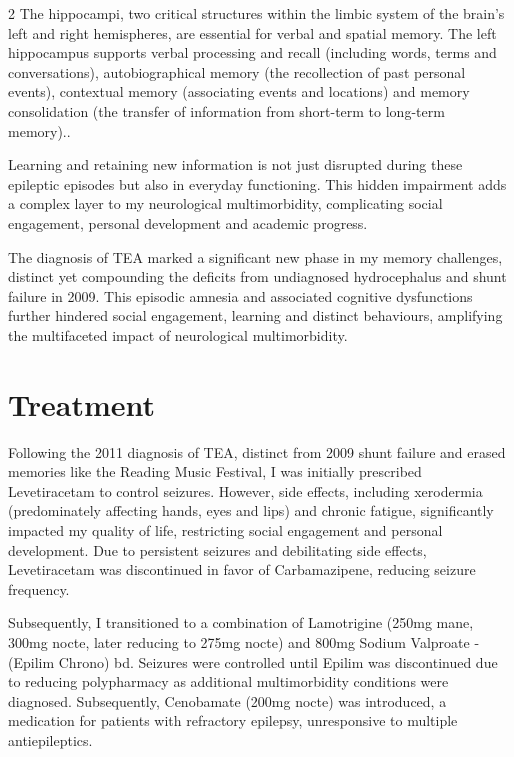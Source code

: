 \documentclass{article}
\begin{document}
\begin{multicols}{2}
The hippocampi, two critical structures within the limbic system of the brain's left and right hemispheres, are essential for verbal and spatial memory. The left hippocampus supports verbal processing and recall (including words, terms and conversations), autobiographical memory (the recollection of past personal events), contextual memory (associating events and locations) and memory consolidation (the transfer of information from short-term to long-term memory).\cite{squire1992,burgess2002}.

Learning and retaining new information is not just disrupted during these epileptic episodes but also in everyday functioning. This hidden impairment adds a complex layer to my neurological multimorbidity, complicating social engagement, personal development and academic progress.\cite{squire1992,zeman2010}

The diagnosis of TEA marked a significant new phase in my memory challenges, distinct yet compounding the deficits from undiagnosed hydrocephalus and shunt failure in 2009. This episodic amnesia and associated cognitive dysfunctions further hindered social engagement, learning and distinct behaviours, amplifying the multifaceted impact of neurological multimorbidity.\cite{zeman2010,miskin2020}

\section*{Treatment}
Following the 2011 diagnosis of TEA, distinct from 2009 shunt failure and erased memories like the Reading Music Festival, I was initially prescribed Levetiracetam to control seizures. However, side effects, including xerodermia (predominately affecting hands, eyes and lips) and chronic fatigue, significantly impacted my quality of life, restricting social engagement and personal development\cite{patsalos2000,mula2013}. Due to persistent seizures and debilitating side effects, Levetiracetam was discontinued in favor of Carbamazipene, reducing seizure frequency.

Subsequently, I transitioned to a combination of Lamotrigine (250mg mane, 300mg nocte, later reducing to 275mg nocte) and 800mg Sodium Valproate - (Epilim Chrono) bd. Seizures were controlled until Epilim was discontinued due to reducing polypharmacy as additional multimorbidity conditions were diagnosed. Subsequently, Cenobamate (200mg nocte) was introduced, a medication for patients with refractory epilepsy, unresponsive to multiple antiepileptics.\cite{french2020}


\end{multicols}
\end{document}
